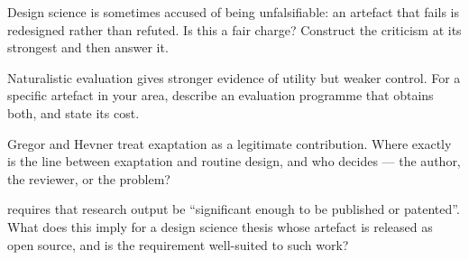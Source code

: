 \begin{reviewq}
  \item Design science is sometimes accused of being unfalsifiable: an artefact
    that fails is redesigned rather than refuted. Is this a fair charge?
    Construct the criticism at its strongest and then answer it.
  \item Naturalistic evaluation gives stronger evidence of utility but weaker
    control. For a specific artefact in your area, describe an evaluation
    programme that obtains both, and state its cost.
  \item Gregor and Hevner treat exaptation as a legitimate contribution.
    Where exactly is the line between exaptation and routine design, and who
    decides --- the author, the reviewer, or the problem?
  \item {} requires that research output be
    ``significant enough to be published or patented''. What does this imply
    for a design science thesis whose artefact is released as open source, and
    is the requirement well-suited to such work?
\end{reviewq}

